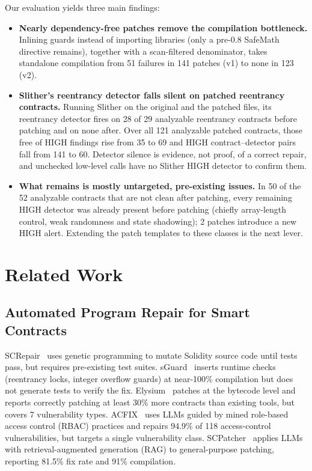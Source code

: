 \documentclass[conference]{IEEEtran}
\begin{document}
Our evaluation yields three main findings:
\begin{itemize}
    \item \textbf{Nearly dependency-free patches remove the compilation bottleneck.} Inlining guards instead of importing libraries (only a pre-0.8 SafeMath directive remains), together with a scan-filtered denominator, takes standalone compilation from 51 failures in 141 patches (v1) to none in 123 (v2).
    \item \textbf{Slither's reentrancy detector falls silent on patched reentrancy contracts.} Running Slither on the original and the patched files, its reentrancy detector fires on 28 of 29 analyzable reentrancy contracts before patching and on none after. Over all 121 analyzable patched contracts, those free of HIGH findings rise from 35 to 69 and HIGH contract--detector pairs fall from 141 to 60. Detector silence is evidence, not proof, of a correct repair, and unchecked low-level calls have no Slither HIGH detector to confirm them.
    \item \textbf{What remains is mostly untargeted, pre-existing issues.} In 50 of the 52 analyzable contracts that are not clean after patching, every remaining HIGH detector was already present before patching (chiefly array-length control, weak randomness and state shadowing); 2 patches introduce a new HIGH alert. Extending the patch templates to these classes is the next lever.
\end{itemize}

\section{Related Work}

\subsection{Automated Program Repair for Smart Contracts}

SCRepair~\cite{screpair2020} uses genetic programming to mutate Solidity source code until tests pass, but requires pre-existing test suites. sGuard~\cite{nguyen2021sguard} inserts runtime checks (reentrancy locks, integer overflow guards) at near-100\% compilation but does not generate tests to verify the fix. Elysium~\cite{elysium2022} patches at the bytecode level and reports correctly patching at least 30\% more contracts than existing tools, but covers 7 vulnerability types. ACFIX~\cite{acfix2024} uses LLMs guided by mined role-based access control (RBAC) practices and repairs 94.9\% of 118 access-control vulnerabilities, but targets a single vulnerability class. SCPatcher~\cite{scpatcher2025} applies LLMs with retrieval-augmented generation (RAG) to general-purpose patching, reporting 81.5\% fix rate and 91\% compilation.
\end{document}
